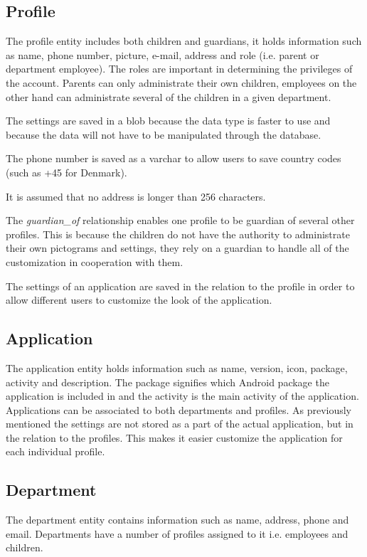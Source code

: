 \subsection{Profile}
The profile entity includes both children and guardians, it holds information such as name, phone number, picture, e-mail, address and role (i.e. parent or department employee). The roles are important in determining the privileges of the account. Parents can only administrate their own children, employees on the other hand can administrate several of the children in a given department. 

The settings are saved in a blob because the data type is faster to use and because the data will not have to be manipulated through the database.

The phone number is saved as a varchar to allow users to save country codes (such as +45 for Denmark). 

It is assumed that no address is longer than 256 characters.

The \emph{guardian\_of} relationship enables one profile to be guardian of several other profiles. This is because the children do not have the authority to administrate their own pictograms and settings, they rely on a guardian to handle all of the customization in cooperation with them. 

The settings of an application are saved in the relation to the profile in order to allow different users to customize the look of the application.

\subsection{Application}
The application entity holds information such as name, version, icon, package, activity and description. 
The package signifies which Android package the application is included in and the activity is the main activity of the application. Applications can be associated to both departments and profiles. As previously mentioned the settings are not stored as a part of the actual application, but in the relation to the profiles. This makes it easier customize the application for each individual profile.
 
\subsection{Department}
The department entity contains information such as name, address, phone and email. Departments have a number of profiles assigned to it i.e. employees and children.

